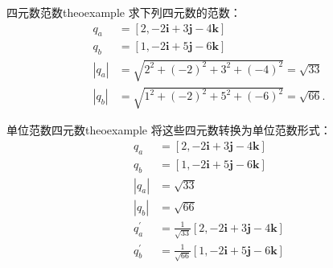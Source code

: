 \begin{myexample}{四元数范数}{theoexample}
求下列四元数的范数：
$$
    \begin{aligned}
        q_{a}              & =[2,-2 \mathbf{i}+3 \mathbf{j}-4 \mathbf{k}]      \\
        q_{b}              & =[1,-2 \mathbf{i}+5 \mathbf{j}-6 \mathbf{k}]      \\
        \left|q_{a}\right| & =\sqrt{2^{2}+(-2)^{2}+3^{2}+(-4)^{2}}=\sqrt{33}   \\
        \left|q_{b}\right| & =\sqrt{1^{2}+(-2)^{2}+5^{2}+(-6)^{2}}=\sqrt{66} .
    \end{aligned}
$$
\end{myexample}

\begin{myexample}{单位范数四元数}{theoexample}
将这些四元数转换为单位范数形式：
$$
    \begin{aligned}
        q_{a}              & =[2,-2 \mathbf{i}+3 \mathbf{j}-4 \mathbf{k}]                    \\
        q_{b}              & =[1,-2 \mathbf{i}+5 \mathbf{j}-6 \mathbf{k}]                    \\
        \left|q_{a}\right| & =\sqrt{33}                                                      \\
        \left|q_{b}\right| & =\sqrt{66}                                                      \\
        q_{a}^{\prime}     & =\frac{1}{\sqrt{33}}[2,-2 \mathbf{i}+3 \mathbf{j}-4 \mathbf{k}] \\
        q_{b}^{\prime}     & =\frac{1}{\sqrt{66}}[1,-2 \mathbf{i}+5 \mathbf{j}-6 \mathbf{k}]
    \end{aligned}
$$
\end{myexample}

